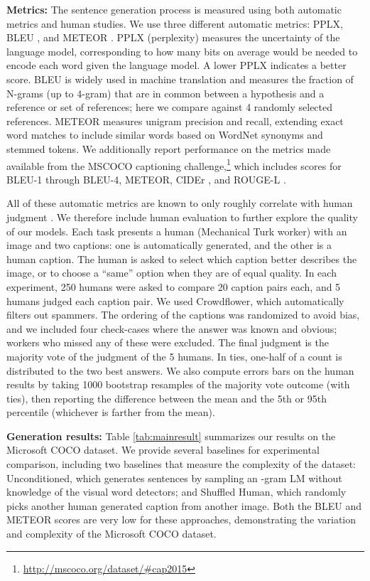 \documentclass[10pt,twocolumn,letterpaper]{article}
\begin{document}
\textbf{Metrics:} The sentence generation process is measured using both automatic metrics and human studies. We use three different automatic metrics: PPLX, BLEU \cite{papineni2002bleu}, and METEOR \cite{banerjee2005meteor}. PPLX (perplexity) measures the uncertainty of the language model, corresponding to how many bits on average would be needed to encode each word given the language model. A lower PPLX indicates a better score. BLEU \cite{papineni2002bleu} is widely used in machine translation and measures the fraction of N-grams (up to 4-gram) that are in common between a hypothesis and a reference or set of references; here we compare against 4 randomly selected references. METEOR \cite{banerjee2005meteor} measures unigram precision and recall, extending exact word matches to include similar words based on WordNet synonyms and stemmed tokens.  We additionally report performance on the metrics made available from the MSCOCO captioning challenge,\footnote{\url{http://mscoco.org/dataset/\#cap2015}} which includes scores for BLEU-1 through BLEU-4, METEOR, CIDEr \cite{VedantamCORR14}, and ROUGE-L \cite{LinACL04}. 

All of these automatic metrics are known to only roughly correlate with human judgment \cite{elliot2014}. We therefore include human evaluation to further explore the quality of our models. Each task presents a human (Mechanical Turk worker) with an image and two captions: one is automatically generated, and the other is a human caption. The human is asked to select which caption better describes the image, or to choose a ``same'' option when they are of equal quality.  In each experiment, 250 humans were asked to compare 20 caption pairs each, and 5 humans judged each caption pair. We used Crowdflower, which automatically filters out spammers. The ordering of the captions was randomized to avoid bias, and we included four check-cases where the answer was known and obvious; workers who missed any of these were excluded. The final judgment is the majority vote of the judgment of the 5 humans. In ties, one-half of a count is distributed to the two best answers.  We also compute errors bars on the human results by taking 1000 bootstrap resamples of the majority vote outcome (with ties), then reporting the difference between the mean and the 5th or 95th percentile (whichever is farther from the mean). 

\textbf{Generation results:} Table \ref{tab:mainresult} summarizes our  results on the Microsoft COCO dataset. We provide several baselines for experimental comparison, including two baselines that measure the complexity of the dataset: Unconditioned, which generates sentences by sampling an -gram LM without knowledge of the visual word detectors; and Shuffled Human, which randomly picks another human generated caption from another image. Both the BLEU and METEOR scores are very low for these approaches, demonstrating the variation and complexity of the Microsoft COCO dataset.
\end{document}
